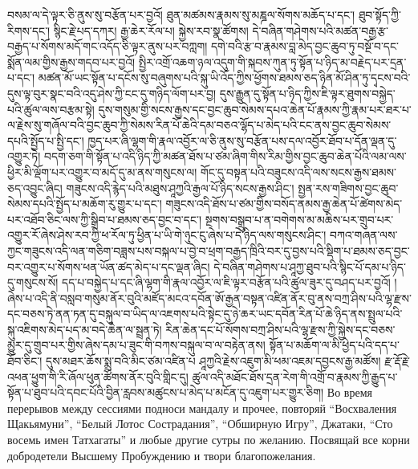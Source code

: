 བསམ་ལ་དེ་ལྟར་ཅི་ནུས་སུ་བརྩོན་པར་བྱའོ། ཐུན་མཚམས་རྣམས་སུ་མཎྜལ་སོགས་མཆོད་པ་དང་། ཐུབ་སྟོད་ཀྱི་རིགས་དང་། སྙིང་རྗེ་པད་དཀར། རྒྱ་ཆེར་རོལ་པ། སྐྱེས་རབ་སྣ་ཚོགས། དེ་བཞིན་གཤེགས་པའི་མཚན་བརྒྱ་རྩ་བརྒྱད་པ་སོགས་མདོ་གང་འདོད་ཅི་ལྟར་ནུས་པར་བཀླག། དགེ་བའི་རྩ་བ་རྣམས་བླ་མེད་བྱང་ཆུབ་ཏུ་བསྔོ་བ་དང་སྨོན་ལམ་གྱིས་རྒྱས་གདབ་པར་བྱའོ། སྤྱིར་འགྲོ་འཆག་ཉལ་འདུག་གི་སྐབས་ཀུན་ཏུ་སྟོན་པ་ཉིད་མ་བརྗེད་པར་དྲན་པ་དང་། མཚན་མོ་ཡང་སྟོན་པ་དངོས་སུ་བཞུགས་པའི་སྐུ་ཡི་འོད་ཀྱིས་ཕྱོགས་ཐམས་ཅད་ཉིན་མོ་ཤིན་ཏུ་དྭངས་བའི་དུས་ལྟ་བུར་སྣང་བའི་འདུ་ཤེས་ཀྱི་ངང་དུ་གཉིད་ལོག་པར་བྱ། དུས་རྒྱུན་དུ་སྟོན་པ་ཉིད་ཀྱིས་ཇི་ལྟར་ཐུགས་བསྐྱེད་པའི་ཚུལ་ལས་བརྩམ་སྟེ། དུས་གསུམ་གྱི་སངས་རྒྱས་དང་བྱང་ཆུབ་སེམས་དཔའ་ཆེན་པོ་རྣམས་ཀྱི་རྣམ་པར་ཐར་པ་ལ་རྗེས་སུ་གཞོལ་བའི་བྱང་ཆུབ་ཀྱི་སེམས་རིན་པོ་ཆེའི་དམ་བཅའ་ལྷོད་པ་མེད་པའི་ངང་ནས་བྱང་ཆུབ་སེམས་དཔའི་སྤྱོད་པ་སྤྱི་དང་། ཁྱད་པར་ཞི་ལྷག་གི་རྣལ་འབྱོར་ལ་ཅི་ནུས་སུ་བརྩོན་པས་དལ་འབྱོར་ཐོབ་པ་དོན་ལྡན་དུ་འགྱུར་ཏེ། བདག་ཅག་གི་སྟོན་པ་འདི་ཉིད་ཀྱི་མཚན་ཐོས་པ་ཙམ་ཞིག་གིས་རིམ་གྱིས་བྱང་ཆུབ་ཆེན་པོའི་ལམ་ལས་ཕྱིར་མི་ལྡོག་པར་འགྱུར་བ་མདོ་དུ་མ་ནས་གསུངས་ལ། གོང་དུ་བསྟན་པའི་བཟུངས་འདི་ལས་སངས་རྒྱས་ཐམས་ཅད་འབྱུང་ཞིང། གཟུངས་འདི་རྙེད་པའི་མཐུས་ཤཱཀྱའི་རྒྱལ་པོ་ཉིད་སངས་རྒྱས་ཤིང་། སྤྱན་རས་གཟིགས་བྱང་ཆུབ་སེམས་དཔའི་སྤྱོད་པ་མཆོག་རུ་གྱུར་པ་དང་། གཟུངས་འདི་ཐོས་པ་ཙམ་གྱིས་བསོད་ནམས་རྒྱ་ཆེན་པོ་ཚེགས་མེད་པར་འཐོབ་ཅིང་ལས་ཀྱི་སྒྲིབ་པ་ཐམས་ཅད་བྱང་བ་དང་། སྔགས་བསྒྲུབ་པ་ན་བགེགས་མ་མཆིས་པར་གྲུབ་པར་འགྱུར་རོ་ཞེས་ཤེས་རབ་ཀྱི་ཕ་རོལ་ཏུ་ཕྱིན་པ་ཡི་གེ་ཉུང་ངུ་ཞེས་པ་དེ་ཉིད་ལས་གསུངས་ཤིང་། བཀའ་གཞན་ལས་ཀྱང་གཟུངས་འདི་ལན་གཅིག་བཟླས་པས་བསྐལ་པ་བྱེ་བ་ཕྲག་བརྒྱད་ཁྲིའི་བར་དུ་བྱས་པའི་སྡིག་པ་ཐམས་ཅད་བྱང་བར་འགྱུར་པ་སོགས་ཕན་ཡོན་ཚད་མེད་པ་དང་ལྡན་ཞིང། དེ་བཞིན་གཤེགས་པ་ཤཱཀྱ་ཐུབ་པའི་སྙིང་པོ་དམ་པ་ཉིད་དུ་གསུངས་སོ། དད་པ་བསྐྱེད་པ་དང་ཞི་ལྷག་གི་རྣལ་འབྱོར་ལ་ཇི་ལྟར་བརྩོན་པའི་ཚུལ་ཟུར་དུ་བཤད་པར་བྱའོ། །ཞེས་པ་འདི་ནི་བསླབ་གསུམ་ནོར་བུའི་མཛོད་མངའ་དབོན་ཨོ་རྒྱན་བསྟན་འཛིན་ནོར་བུ་ནས་བཀྲ་ཤིས་པའི་ལྷ་རྫས་དང་བཅས་ཏེ་ནན་ཏན་དུ་བསྐུལ་བ་ཡིད་ལ་འཇགས་པའི་སྟེང་དུ་ཉེ་ཆར་ཡང་དབོན་རིན་པོ་ཆེ་ཉིད་ནས་སྤྲུལ་པའི་སྐུ་འཇིགས་མེད་པད་མ་བདེ་ཆེན་ལ་སྦྲན་ཏེ། རིན་ཆེན་དང་པོ་སོགས་བཀྲ་ཤིས་པའི་ལྷ་རྫས་ཀྱི་སྐྱེས་དང་བཅས་མྱུར་དུ་གྲུབ་པར་གྱིས་ཞེས་དམ་པ་ཟུང་གི་བཀས་བསྐུལ་བ་ལ་བརྟེན་ནས། སྟོན་པ་མཆོག་ལ་མི་ཕྱེད་པའི་དད་པ་ཐོབ་ཅིང་། དུས་མཐར་ཆོས་སྨྲ་བའི་མིང་ཙམ་འཛིན་པ ཤཱཀྱའི་རྗེས་འཇུག་མི་ཕམ་འཇམ་དབྱངས་རྒྱ་མཚོས། རྫ་རྡོ་རྗེ་འཕན་ཕྱུག་གི་རི་ཞོལ་ཕུན་ཚོགས་ནོར་བུའི་གླིང་དུ། ཚུལ་འདི་མཐོང་ཐོས་དྲན་རེག་གི་འགྲོ་བ་རྣམས་ཀྱི་རྒྱུད་པ་སྟོན་པ་ཐུབ་པའི་དབང་པོའི་བྱིན་རླབས་མཚུངས་པ་མེད་པ་མངོན་དུ་འཇུག་པར་གྱུར་ཅིག།
\ru
\normalsize
\newpage
\scriptsize
Во время перерывов между сессиями подноси мандалу и прочее,
повторяй “Восхваления Щакьямуни”, “Белый Лотос Сострадания”, “Обширную Игру”,
Джатаки, “Сто восемь имен Татхагаты” и любые другие сутры по желанию.
Посвящай все корни добродетели Высшему Пробуждению и твори благопожелания.
